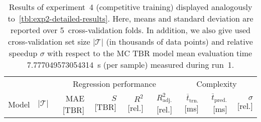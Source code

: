 \begin{table}[h]
	\centering
	\setlength\tabcolsep{4pt}
	{\scriptsize
		\begin{tabular}{lrrrrrrrr}
		\toprule
		{} & {} & \multicolumn{4}{c}{Regression performance} &
		\multicolumn{3}{c}{Complexity}\\
		\cmidrule(lr){3-6}
		\cmidrule(lr){7-9}
		Model & $|\mathcal{T}|$ & MAE [TBR] & $S$ [TBR] & $R^2$ [rel.] & $R^2_{\text{adj.}}$ [rel.]
						& $\overline{t}_{\text{trn.}}$ [\si{\milli\second}] &
		$\overline{t}_{\text{pred.}}$ [\si{\milli\second}] & $\sigma$ [rel.]\\
		\midrule
		
		\bottomrule
		\end{tabular}
	}
	\caption{Results of experiment~4 (competitive training) displayed analogously
		to~\cref{tbl:exp2-detailed-results}. Here, means and standard deviation
		are reported over 5~cross-validation folds. In addition, we also give
		used cross-validation set size $|\mathcal{T}|$ (in thousands of data
		points) and relative speedup $\sigma$ with respect to the
		MC TBR model mean evaluation time \SI{7.777049573054314}{\second} (per
		sample) measured during run~1.}
	\label{tbl:exp4-detailed-results}
\end{table}

